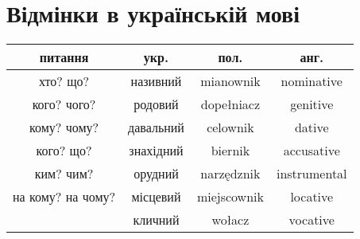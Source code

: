 \documentclass[12pt]{article}
\begin{document}
\section*{Відмінки в українській мові}

\begin{center}
\begin{tabular}{ |c|c|c|c| }
	\hline
	питання & укр. & пол. & анг. \\
	\hline
	хто? що? & називний & mianownik & nominative \\
	кого? чого? & родовий & dopełniacz & genitive \\
	кому? чому? & давальний & celownik & dative \\
	кого? що? & знахідний & biernik & accusative \\
	ким? чим? & орудний & narzędznik & instrumental \\
	на кому? на чому? & місцевий & miejscownik & locative \\
	& кличний & wołacz & vocative \\
	\hline
\end{tabular}
\end{center}
\end{document}
